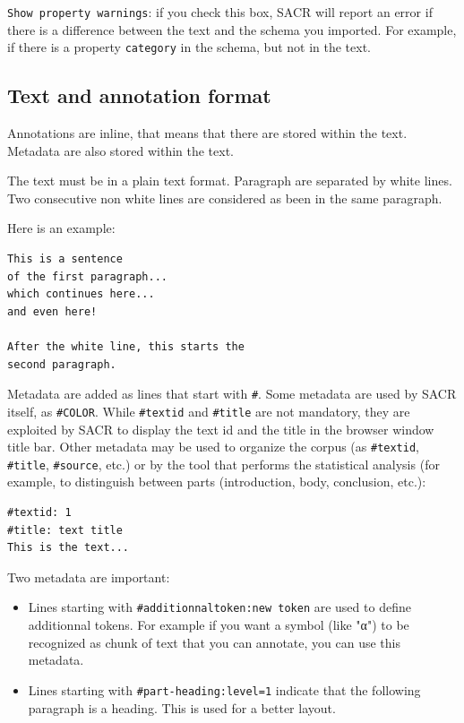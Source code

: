 \documentclass[12pt]{article}
\begin{document}
\verb|Show property warnings|: if you check this box, SACR will report an
error if there is a difference between the text and the schema you imported.
For example, if there is a property \verb|category| in the schema, but not in
the text.

 \subsection{Text and annotation format}

Annotations are inline, that means that there are stored within the text.
Metadata are also stored within the text.

The text must be in a plain text format.  Paragraph are separated by white
lines. Two consecutive non white lines are considered as been in the same
paragraph.

Here is an example:

\begin{minipage}{\linewidth}
\begin{mdframed}
\begin{verbatim}
This is a sentence
of the first paragraph...
which continues here...
and even here!

After the white line, this starts the
second paragraph.
\end{verbatim}
\end{mdframed}
\end{minipage}

Metadata are added as lines that start with \verb|#|.  Some metadata are used
by SACR itself, as \verb|#COLOR|.  While \verb|#textid| and \verb|#title| are
not mandatory, they are exploited by SACR to display the text id and the
title in the browser window title bar.  Other metadata may be used to
organize the corpus (as \verb|#textid|, \verb|#title|, \verb|#source|, etc.)
or by the tool that performs the statistical analysis (for example, to
distinguish between parts (introduction, body, conclusion, etc.):

\begin{mdframed}
\begin{verbatim}
#textid: 1
#title: text title
This is the text...
\end{verbatim}
\end{mdframed}

Two metadata are important:
\begin{itemize}
   \item Lines starting with \verb+#additionnaltoken:new token+ are used to
   define additionnal tokens.  For example if you want a symbol (like "α") to
   be recognized as chunk of text that you can annotate, you can use this
   metadata.
   \item Lines starting with \verb+#part-heading:level=1+ indicate that the
   following paragraph is a heading.  This is used for a better layout.
\end{itemize}
\end{document}
